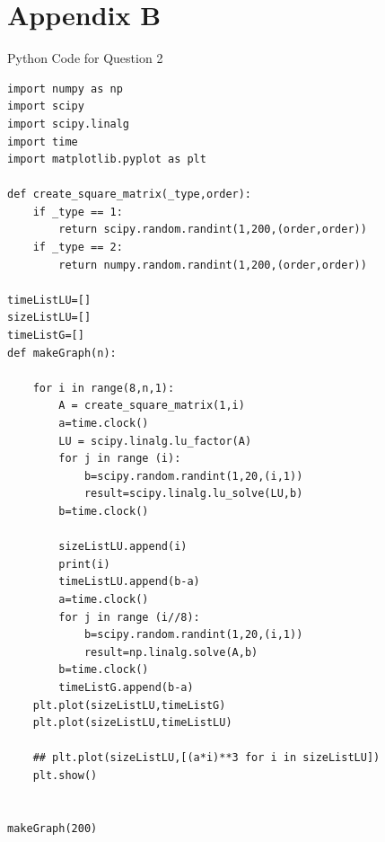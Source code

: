 \documentclass[a4paper, 11pt]{article}
\begin{document}
\newpage

\section{Appendix B}
Python Code for Question 2

\begin{verbatim}
import numpy as np
import scipy
import scipy.linalg
import time
import matplotlib.pyplot as plt

def create_square_matrix(_type,order):
    if _type == 1:
        return scipy.random.randint(1,200,(order,order))
    if _type == 2:
        return numpy.random.randint(1,200,(order,order))
    
timeListLU=[]
sizeListLU=[]
timeListG=[]
def makeGraph(n):
    
    for i in range(8,n,1):
        A = create_square_matrix(1,i)
        a=time.clock()
        LU = scipy.linalg.lu_factor(A)
        for j in range (i):
            b=scipy.random.randint(1,20,(i,1))
            result=scipy.linalg.lu_solve(LU,b)   
        b=time.clock()
        
        sizeListLU.append(i)
        print(i)
        timeListLU.append(b-a)
        a=time.clock()
        for j in range (i//8):
            b=scipy.random.randint(1,20,(i,1))
            result=np.linalg.solve(A,b)
        b=time.clock()
        timeListG.append(b-a)
    plt.plot(sizeListLU,timeListG)
    plt.plot(sizeListLU,timeListLU)
    
    ## plt.plot(sizeListLU,[(a*i)**3 for i in sizeListLU])
    plt.show()


makeGraph(200)
\end{verbatim}

\newpage
\end{document}
